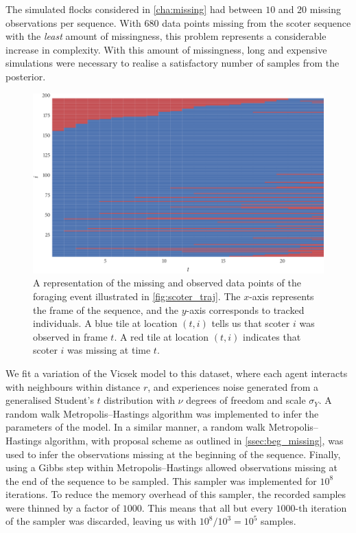 The simulated flocks considered in \cref{cha:missing} had between $10$ and $20$
missing observations per sequence. With $680$ data points missing from the
scoter sequence with the \emph{least} amount of missingness, this problem
represents a considerable increase in complexity. With this amount of
missingness, long and expensive simulations were necessary to realise a
satisfactory number of samples from the posterior.

\begin{figure}[tb]
  \includegraphics{data_00_missing.pdf}
  \caption{A representation of the missing and observed data points of the
    foraging event illustrated in \cref{fig:scoter_traj}. The $x$-axis
    represents the frame of the sequence, and the $y$-axis corresponds to
    tracked individuals. A blue tile at location $(t, i)$ tells us that scoter
    $i$ was observed in frame $t$. A red tile at location $(t, i)$ indicates
    that scoter $i$ was missing at time $t$.}
  \label{fig:scoter_missing}
\end{figure}

We fit a variation of the Vicsek model to this dataset, where each agent
interacts with neighbours within distance $r$, and experiences noise generated
from a generalised Student's $t$ distribution with $\nu$ degrees of freedom and
scale $\sigma_Y$. A random walk Metropolis--Hastings algorithm was implemented
to infer the parameters of the model. In a similar manner, a random walk
Metropolis--Hastings algorithm, with proposal scheme as outlined in
\cref{ssec:beg_missing}, was used to infer the observations missing at the
beginning of the sequence. Finally, using a Gibbs step within
Metropolis--Hastings allowed observations missing at the end of the sequence to
be sampled. This sampler was implemented for $10^8$ iterations. To reduce the
memory overhead of this sampler, the recorded samples were thinned by a factor
of $1000$. This means that all but every $1000$-th iteration of the sampler
was discarded, leaving us with $10^8 / 10^3 = 10^5$ samples.

